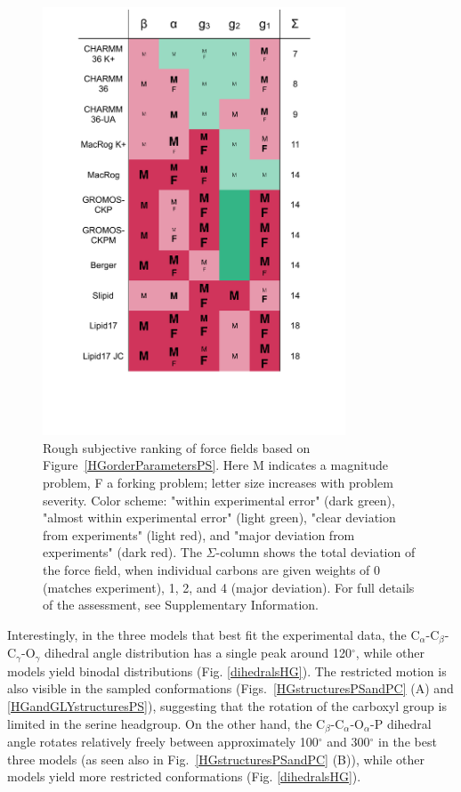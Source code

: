 \documentclass[journal=jpcbfk,manuscript=article]{achemso}
\begin{document}
\begin{figure}[]
  \centering
  \includegraphics[width=9.0cm]{../Figs/comparisonTablePS.pdf}
  \caption{\label{comparisonTablePS}
    Rough subjective ranking of force fields based on Figure~\ref{HGorderParametersPS}.
    Here {\textsf{\small M}} indicates a magnitude problem, {\textsf{\small F}} a forking problem; letter size increases with problem severity. Color scheme: "within experimental error" (dark green), "almost within experimental error" (light green), "clear deviation from experiments" (light red), and "major deviation from experiments" (dark red). The $\Sigma$-column shows the total deviation of the force field, when individual carbons are given weights of 0 (matches experiment), 1, 2, and 4 (major deviation). For full details of the assessment, see Supplementary Information.
  }
\end{figure}


Interestingly, in the three models that best fit the experimental data,
the C$_\alpha$-C$_\beta$-C$_\gamma$-O$_\gamma$ dihedral angle distribution has a single peak around 120$^{\circ}$, while
other models yield binodal distributions (Fig. \ref{dihedralsHG}).
The restricted motion is also visible in the sampled conformations (Figs.~\ref{HGstructuresPSandPC} (A) and \ref{HGandGLYstructuresPS}),
suggesting that the rotation of the carboxyl group is limited in the serine headgroup.
On the other hand, the C$_\beta$-C$_\alpha$-O$_\alpha$-P dihedral angle rotates relatively
freely between approximately 100$^{\circ}$ and 300$^{\circ}$ in the best three models (as seen also in Fig.~\ref{HGstructuresPSandPC} (B)),
while other models yield more restricted conformations (Fig. \ref{dihedralsHG}).
\end{document}

